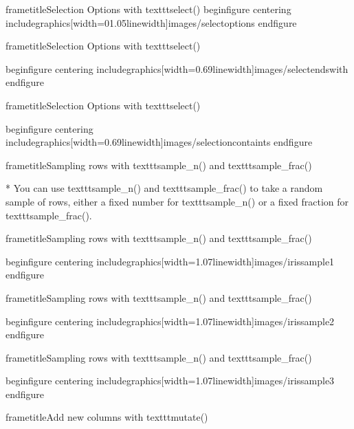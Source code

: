 	
	
	
		frametitle{Selection Options with texttt{select()}}
		begin{figure}
			centering
			includegraphics[width=01.05linewidth]{images/selectoptions}
		end{figure}
		
	
	
		frametitle{Selection Options with texttt{select()}}
		
		begin{figure}
			centering
			includegraphics[width=0.69linewidth]{images/selectendswith}
		end{figure}
		
	
	
	
	
		frametitle{Selection Options with texttt{select()}}
		
		begin{figure}
			centering
			includegraphics[width=0.69linewidth]{images/selectioncontaints}
		end{figure}
		
	
	
	
	
		frametitle{Sampling rows with texttt{sample_n()} and texttt{sample_frac()}}
		
			         * You can use texttt{sample_n()} and texttt{sample_frac()} to take a random sample of rows, either a fixed number for texttt{sample_n()} or a fixed fraction for texttt{sample_frac()}.
		
	
	
	
		frametitle{Sampling rows with texttt{sample_n()} and texttt{sample_frac()}}
		
		begin{figure}
			centering
			includegraphics[width=1.07linewidth]{images/irissample1}
		end{figure}
		
	
	
		frametitle{Sampling rows with texttt{sample_n()} and texttt{sample_frac()}}
		
		begin{figure}
			centering
			includegraphics[width=1.07linewidth]{images/irissample2}
		end{figure}
		
	
	
		frametitle{Sampling rows with texttt{sample_n()} and texttt{sample_frac()}}
		
		begin{figure}
			centering
			includegraphics[width=1.07linewidth]{images/irissample3}
		end{figure}
		
	
	
		frametitle{Add new columns with texttt{mutate()} }
		
